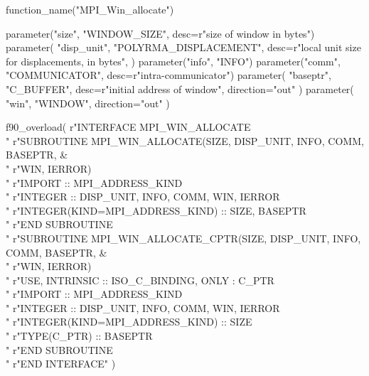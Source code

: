 %
%
\begin{mpi-binding}
    function_name("MPI_Win_allocate")
    
    parameter("size", "WINDOW_SIZE", desc=r"size of window in bytes")
    parameter(
        "disp_unit",
        "POLYRMA_DISPLACEMENT",
        desc=r"local unit size for displacements, in bytes",
    )
    parameter("info", "INFO")
    parameter("comm", "COMMUNICATOR", desc=r"intra-communicator")
    parameter(
        "baseptr", "C_BUFFER", desc=r"initial address of window", direction="out"
    )
    parameter(
        "win", "WINDOW", direction="out"
    )
    
    f90_overload(
        r"\>INTERFACE MPI\_WIN\_ALLOCATE \\ "
        r"\>\>SUBROUTINE MPI\_WIN\_ALLOCATE(SIZE, DISP\_UNIT, INFO, COMM, BASEPTR, \& \\ "
        r"\>\>\>\>WIN, IERROR) \\ "
        r"\>\>\>IMPORT :: MPI\_ADDRESS\_KIND \\ "
        r"\>\>\>INTEGER :: DISP\_UNIT, INFO, COMM, WIN, IERROR \\ "
        r"\>\>\>INTEGER(KIND=MPI\_ADDRESS\_KIND) :: SIZE, BASEPTR \\ "
        r"\>\>END SUBROUTINE \\ "
        r"\>\>SUBROUTINE MPI\_WIN\_ALLOCATE\_CPTR(SIZE, DISP\_UNIT, INFO, COMM, BASEPTR, \& \\ "
        r"\>\>\>\>WIN, IERROR) \\ "
        r"\>\>\>USE, INTRINSIC :: ISO\_C\_BINDING, ONLY : C\_PTR \\ "
        r"\>\>\>IMPORT :: MPI\_ADDRESS\_KIND \\ "
        r"\>\>\>INTEGER :: DISP\_UNIT, INFO, COMM, WIN, IERROR \\ "
        r"\>\>\>INTEGER(KIND=MPI\_ADDRESS\_KIND) :: SIZE \\ "
        r"\>\>\>TYPE(C\_PTR) :: BASEPTR \\ "
        r"\>\>END SUBROUTINE \\ "
        r"\>END INTERFACE"
    )
\end{mpi-binding}


